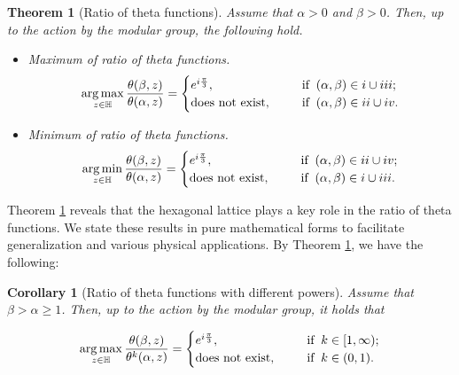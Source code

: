 \documentclass[reqno,english]{amsart}
\newtheorem{corollary}{Corollary}[section]
\newtheorem{open problem}{Open Problem}[section]
\newtheorem{open question}{Open Question}[section]
\newtheorem{open questions on hexagonal lattice}{Open Questions on hexagonal lattice}[section]
\newtheorem{theorem}{Theorem}[section]
\DeclareMathOperator*{\argmax}{arg\,max}
\DeclareMathOperator*{\argmin}{arg\,min}
\begin{document}
\begin{theorem}[Ratio of theta functions]\label{Th1} Assume that $\alpha>0$ and $\beta>0$. Then, up to the action by the modular group, the following hold.
\begin{itemize}
  \item [(a)] Maximum of ratio of theta functions.
\begin{equation}\aligned\nonumber
\argmax_{z\in\mathbb{H}}\frac{\theta(\beta,z)}{\theta(\alpha,z)}=\begin{cases}
e^{i\frac{\pi}{3}},\;\;\;\;\;\;&\hbox{if}\;\;(\alpha,\beta)\in\uppercase\expandafter{\romannumeral1}\cup\uppercase\expandafter{\romannumeral3};\\
\text{does not exist},\;\;\;\;\;\;&\hbox{if}\;\;(\alpha,\beta)\in\uppercase\expandafter{\romannumeral2}\cup\uppercase\expandafter{\romannumeral4}.
\end{cases}
\endaligned\end{equation}


  \item [(b)]
Minimum of ratio of theta functions.
\begin{equation}\aligned\nonumber
\argmin_{z\in\mathbb{H}}\frac{\theta(\beta,z)}{\theta(\alpha,z)}=\begin{cases}
e^{i\frac{\pi}{3}},\;\;\;\;\;\;&\hbox{if}\;\;(\alpha,\beta)\in\uppercase\expandafter{\romannumeral2}\cup\uppercase\expandafter{\romannumeral4};\\
\text{does not exist},\;\;\;\;\;\;&\hbox{if}\;\;(\alpha,\beta)\in\uppercase\expandafter{\romannumeral1}\cup\uppercase\expandafter{\romannumeral3}.
\end{cases}
\endaligned\end{equation}



\end{itemize}

\end{theorem}

Theorem \ref{Th1} reveals that the hexagonal lattice plays a key role in the ratio of theta functions. We state these results in pure mathematical forms to facilitate generalization and various physical applications.
By Theorem \ref{Th1}, we have the following:
\begin{corollary}[Ratio of theta functions with different powers]\label{Coro1} Assume that $\beta>\alpha\geq1$. Then, up to the action by the modular group, it holds that

\begin{equation}\aligned\nonumber
\argmax_{z\in\mathbb{H}}\frac{\theta(\beta,z)}{\theta^k(\alpha,z)}=\begin{cases}
e^{i\frac{\pi}{3}},\;\;\;\;\;\;&\hbox{if}\;\;k\in[1,\infty);\\
\text{does not exist},\;\;\;\;\;\;&\hbox{if}\;\;k\in(0,1).
\end{cases}
\endaligned\end{equation}



\end{corollary}
\end{document}
